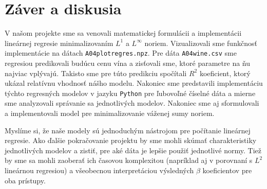 \documentclass[report.tex]{subfiles}
\begin{document}
	
	\section{Záver a diskusia}	
	
	V našom projekte sme sa venovali matematickej formulácii a implementácii lineárnej regresie minimalizovaním $L^1$ a $L^{\infty}$ noriem. Vizualizovali sme funkčnosť implementácie na dátach \verb|A04plotregres.npz|. Pre dáta \verb|A04wine.csv| sme regresiou predikovali budúcu cenu vína a zisťovali sme, ktoré parametre na ňu najviac vplývajú. Takisto sme pre túto predikciu spočítali $R^2$ koeficient, ktorý ukázal relatívnu vhodnosť nášho modelu. Nakoniec sme predstavili implementáciu týchto regresných modelov v jazyku \verb|Python| pre ľubovoľné číselné dáta a mierne sme analyzovali správanie sa jednotlivých modelov. Nakoniec sme aj sformulovali a implementovali model pre minimalizovanie váženej sumy noriem.
	
	Myslíme si, že naše modely sú jednoduchým nástrojom pre počítanie lineárnej regresie. Ako ďalšie pokračovanie projektu by sme mohli skúmať charakteristiky jednotlivých modelov a zistiť, pre aké dáta je lepšie použiť jednotlivé normy. Tiež by sme sa mohli zaoberať ich časovou komplexitou (napríklad aj v porovnaní s $L^2$ lineárnou regresiou) a všeobecnou interpretáciou výsledných $\beta$ koeficientov pre oba prístupy.
	
\end{document}
